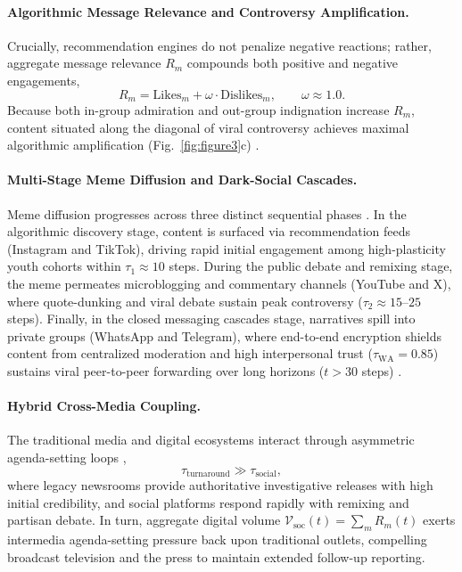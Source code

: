 \documentclass{article}
\begin{document}
\paragraph{Algorithmic Message Relevance and Controversy Amplification.}
Crucially, recommendation engines do not penalize negative reactions; rather, aggregate message relevance $R_m$ compounds both positive and negative engagements,
\begin{equation}
    R_m = \mathrm{Likes}_m + \omega \cdot \mathrm{Dislikes}_m, \qquad \omega \approx 1.0.
    \label{eq:message_relevance_methods}
\end{equation}
Because both in-group admiration and out-group indignation increase $R_m$, content situated along the diagonal of viral controversy achieves maximal algorithmic amplification (Fig.~\ref{fig:figure3}c) \citep{crockett2017moral}.

\paragraph{Multi-Stage Meme Diffusion and Dark-Social Cascades.}
Meme diffusion progresses across three distinct sequential phases \citep{leskovec2009meme}. In the algorithmic discovery stage, content is surfaced via recommendation feeds (Instagram and TikTok), driving rapid initial engagement among high-plasticity youth cohorts within $\tau_1 \approx 10$ steps. During the public debate and remixing stage, the meme permeates microblogging and commentary channels (YouTube and X), where quote-dunking and viral debate sustain peak controversy ($\tau_2 \approx 15\text{--}25$ steps). Finally, in the closed messaging cascades stage, narratives spill into private groups (WhatsApp and Telegram), where end-to-end encryption shields content from centralized moderation and high interpersonal trust ($\tau_{\mathrm{WA}} = 0.85$) sustains viral peer-to-peer forwarding over long horizons ($t > 30$ steps) \citep{resende2019whatsapp, garimella2020images}.

\paragraph{Hybrid Cross-Media Coupling.}
The traditional media and digital ecosystems interact through asymmetric agenda-setting loops \citep{chadwick2017hybrid, harder2017intermedia},
\begin{equation}
    \tau_{\mathrm{turnaround}} \gg \tau_{\mathrm{social}},
    \label{eq:timescale_ratio}
\end{equation}
where legacy newsrooms provide authoritative investigative releases with high initial credibility, and social platforms respond rapidly with remixing and partisan debate. In turn, aggregate digital volume $\mathcal{V}_{\mathrm{soc}}(t) = \sum_m R_m(t)$ exerts intermedia agenda-setting pressure back upon traditional outlets, compelling broadcast television and the press to maintain extended follow-up reporting.
\end{document}
